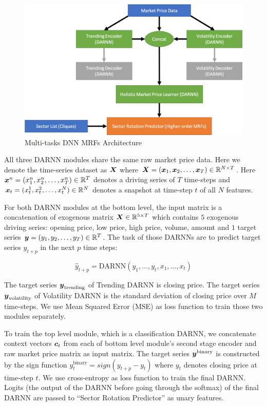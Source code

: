 \documentclass[sigconf, anonymous, review]{acmart}
\begin{document}
\begin{figure}[ht]
  \centering
  \includegraphics[width=1\columnwidth]{Methodology/figures/mrfrnn}
  \caption{\label{fig:mrfrnn} Multi-tasks DNN MRFs Architecture}
\end{figure}

All three DARNN modules share the same raw market price data.
Here we denote the time-series dataset as ${\boldsymbol{X}}$ where
${\boldsymbol{X}}=({\boldsymbol{x}}_1,{\boldsymbol{x}}_2,\dots,{\boldsymbol{x}}_T)\in \mathbb{R}^{N\times T}$. Here
${\boldsymbol{x}}^n=(x_1^n,x_2^n,\dots,x_T^n) \in \mathbb{R}^T$ denotes a driving
series of $T$ time-steps and ${\boldsymbol{x}}_t=(x_t^1,x_t^2\\ ,\dots
,x_t^N)\in \mathbb{R}^N$ denotes a snapshot at time-step $t$ of all
$N$ features.

For both DARNN modules at the bottom level, the input matrix is a
concatenation of exogenous matrix ${\boldsymbol{X}} \in \mathbb{R}^{5\times T}$
which contains $5$ exogenous driving series: opening price, low
price, high price, volume, amount and $1$ target series ${\boldsymbol{y}} =
(y_1,y_2,\dots,y_T) \in \mathbb{R}^T$. The task of those DARNNs are
to predict target series $y_{t+p}$ in the next $p$ time steps:

$$\hat{y}_{t+p} = \text{DARNN}(y_1,\dots,y_{t},x_1,\dots,x_t)$$

The target series ${\boldsymbol{y}}_{\text{trending}}$ of Trending DARNN is
closing price. The target series ${\boldsymbol{y}}_{\text{volatility}}$ of
Volatility DARNN is the standard deviation of closing price over
$M$ time-steps. We use Mean Squared Error (MSE) as loss function
to train those two modules separately.

To train the top level module, which is a classification DARNN,
we concatenate context vectors $\boldsymbol{c}_t$ from each of bottom level
module's second stage encoder and raw market price matrix as
input matrix. The target series ${\boldsymbol{y}}^{\text{binary}}$ is
constructed by the sign function $y_t^{\text{binary}} =
sign(y_{t+p}-y_t)$ where $y_t$ denotes closing price at time-step
$t$. We use cross-entropy as loss function to train the final
DARNN. Logits (the output of the DARNN before going through the
softmax) of the final DARNN are passed to ``Sector Rotation
Predictor'' as unary features.
\end{document}
